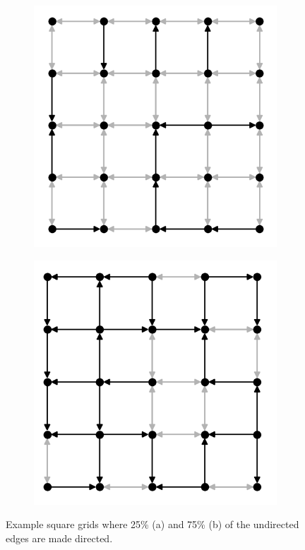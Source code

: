\begin{figure}[htb]
  \centering
  \begin{subfigure}{.40\textwidth}
    \centering
    \includegraphics[width=1.0\linewidth]{figures/dir_lattice_025.png}
    \caption{}
    \label{fig:dir-lattice-a}
  \end{subfigure}
  \hspace{25pt}
  \begin{subfigure}{.40\textwidth}
    \centering
    \includegraphics[width=1.0\linewidth]{figures/dir_lattice_075.png}
    \caption{}
    \label{fig:dir-lattice-b}
  \end{subfigure}
  \caption{
    Example square grids where 25\% (a) and 75\% (b) of the undirected edges are
made directed.
  }
  \label{fig:dir-lattice}
\end{figure}

